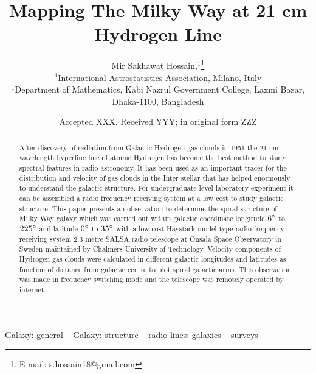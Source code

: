 \documentclass[fleqn,usenatbib]{mnras}
\title[Running Head]{Mapping The Milky Way at 21 cm Hydrogen Line}
\author[Mir Sakhawat Hossain et al.]{
Mir Sakhawat Hossain,$^{1}$\thanks{E-mail: s.hossain18@gmail.com}
\\
$^{1}$International Astrostatistics Association, Milano, Italy\\
$^{1}$Department of Mathematics, Kabi Nazrul Government College, Laxmi Bazar, Dhaka-1100, Bangladesh\\
}
\date{Accepted XXX. Received YYY; in original form ZZZ}
\begin{document}
\label{firstpage}
\pagerange{\pageref{firstpage}--\pageref{lastpage}}
\maketitle

\begin{abstract}
After discovery of radiation from Galactic Hydrogen gas clouds in 1951 the 21 cm wavelength hyperfine line of atomic Hydrogen has become the best method to study spectral features in radio astronomy. It has been used as an important tracer for the distribution and velocity of gas clouds in the Inter stellar that has helped enormously to understand the galactic structure. For undergraduate level laboratory experiment it can be assembled a radio frequency receiving system at a low cost to study galactic structure. This paper presents an observation to determine the spiral structure of Milky Way galaxy which was carried out within galactic coordinate longitude $6\hbox{$^\circ$}$ to $225\hbox{$^\circ$}$ and latitude $0\hbox{$^\circ$}$ to $35\hbox{$^\circ$}$ with a low cost Haystack model type radio frequency receiving system $2.3$ metre SALSA radio telescope at Onsala Space Observatory in Sweden maintained by Chalmers University of Technology. Velocity components of Hydrogen gas clouds were calculated in different galactic longitudes and latitudes as function of distance from galactic centre to plot spiral galactic arms. This observation was made in frequency switching mode and the telescope was remotely operated by internet.
\end{abstract}

\begin{keywords}
Galaxy: general -- Galaxy: structure -- radio lines: galaxies -- surveys
\end{keywords}


\end{document}
